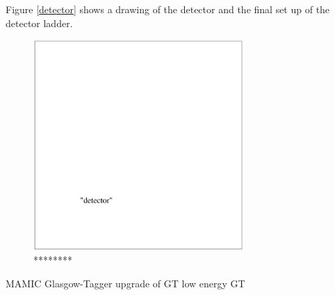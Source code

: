 Figure \ref{detector} shows a drawing of the detector and the final
set up of the detector ladder.

\begin{figure}
\begin{center}
\includegraphics[height=8cm]{./et_detector.eps}
\vspace*{-1cm}
\end{center}
\caption{********}
\label{etector}
\end{figure}


\begin{thebibliography}{99}
 MAMIC
 Glasgow-Tagger
 upgrade of GT
 low energy GT


\end{thebibliography}
